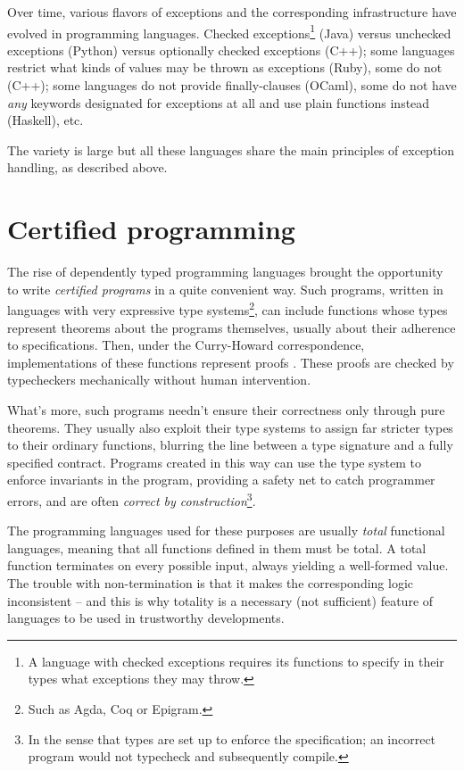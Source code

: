 Over time, various flavors of exceptions and the corresponding infrastructure have evolved
in programming languages. Checked exceptions\footnote{A language with checked exceptions
requires its functions to specify in their types what exceptions they may throw.} (Java)
versus unchecked exceptions (Python) versus optionally checked exceptions (C++); some
languages restrict what kinds of values may be thrown as exceptions (Ruby), some do not (C++);
some languages do not provide finally-clauses (OCaml), some do not have \emph{any}
keywords designated for exceptions at all and use plain functions instead (Haskell), etc.

The variety is large but all these languages share the main principles of exception handling,
as described above.

\section{Certified programming}

The rise of dependently typed programming languages brought the opportunity to write
\emph{certified programs} in a quite convenient way. Such programs, written in languages
with very expressive type systems\footnote{Such as Agda, Coq or Epigram.}, can include
functions whose types represent theorems
about the programs themselves, usually about their adherence to specifications.
Then, under the Curry-Howard correspondence, implementations of these functions
represent proofs \cite{howard80}. These proofs are checked by typecheckers mechanically
without human intervention.

What's more, such programs needn't ensure their correctness only through pure theorems.
They usually also exploit
their type systems to assign far stricter types to their ordinary functions, blurring the line
between a type signature and a fully specified contract. Programs created in this way
can use the type system to enforce invariants in the program, providing a safety net
to catch programmer errors, and are often \emph{correct by construction}\footnote{In the
sense that types are set up to enforce the specification; an incorrect program would
not typecheck and subsequently compile.}.

The programming languages used for these purposes are usually \emph{total} functional
languages, meaning that all functions defined in them must be total. A total function terminates
on every possible input, always yielding a well-formed value. The trouble with non-termination
is that it makes the corresponding logic inconsistent -- and this is why totality is a necessary
(not sufficient) feature of languages to be used in trustworthy developments.

